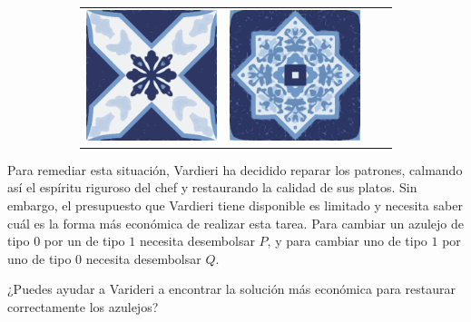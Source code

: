 \documentclass{oci}
\begin{document}
\begin{problemDescription}
\begin{figure}[h]
\begin{subfigure}{0.45\textwidth}
\begin{center}
{\begin{tabular}{cccc}
        \includegraphics[scale=0.3]{b.eps} &
        \includegraphics[scale=0.3]{a.eps}
      \end{tabular}
    }
  \end{center}
\end{subfigure}
\end{figure}

Para remediar esta situación, Vardieri ha decidido reparar los patrones, calmando
así el espíritu riguroso del chef y restaurando la calidad de sus platos.
Sin embargo, el presupuesto que Vardieri tiene disponible es limitado y necesita saber cuál es la forma más económica de realizar esta tarea.
Para cambiar un azulejo de tipo $0$ por un de tipo $1$ necesita desembolsar $P$, y para cambiar uno de tipo $1$ por uno de tipo $0$ necesita desembolsar $Q$.


¿Puedes ayudar a Varideri a encontrar la solución más económica para restaurar correctamente los azulejos?

\end{problemDescription}
\end{document}
